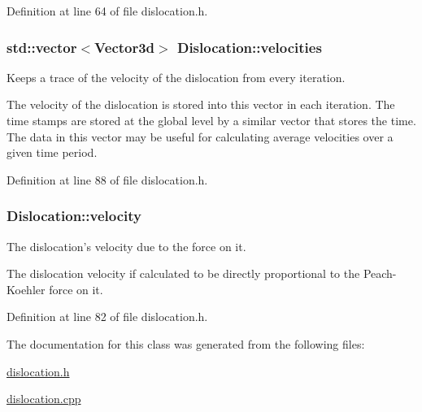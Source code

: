 \-Definition at line 64 of file dislocation.\-h.

\hypertarget{classDislocation_a9ccdef63384a8b965e70f13920a852f8}{
\subsubsection[{velocities}]{\setlength{\rightskip}{0pt plus 5cm}std\-::vector$<${\bf \-Vector3d}$>$ {\bf \-Dislocation\-::velocities}}}\label{d3/dc6/classDislocation_a9ccdef63384a8b965e70f13920a852f8}


\-Keeps a trace of the velocity of the dislocation from every iteration. 

\-The velocity of the dislocation is stored into this vector in each iteration. \-The time stamps are stored at the global level by a similar vector that stores the time. \-The data in this vector may be useful for calculating average velocities over a given time period. 

\-Definition at line 88 of file dislocation.\-h.

\hypertarget{classDislocation_ad6f4e8e94b2525c2e58a77b9d2916c0e}{
\subsubsection[{velocity}]{ {\bf \-Dislocation\-::velocity}}}\label{d3/dc6/classDislocation_ad6f4e8e94b2525c2e58a77b9d2916c0e}


\-The dislocation's velocity due to the force on it. 

\-The dislocation velocity if calculated to be directly proportional to the \-Peach-\/\-Koehler force on it. 

\-Definition at line 82 of file dislocation.\-h.



\-The documentation for this class was generated from the following files\-:\begin{DoxyCompactItemize}
\item 
\hyperlink{dislocation_8h}{dislocation.\-h}\item 
\hyperlink{dislocation_8cpp}{dislocation.\-cpp}\end{DoxyCompactItemize}
